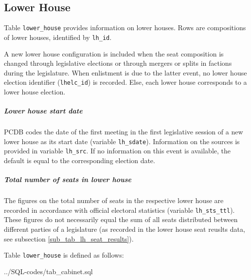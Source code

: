 \subsection{Lower House}\label{subsec_tab_lower_house}
Table \texttt{\footnotesize lower\_house} provides information on lower houses.
Rows are compositions of lower houses, identified by \texttt{\footnotesize lh\_id}. 

A new lower house configuration is included when the seat composition is changed through legislative elections or through mergers or splits in factions during the legislature. When enlistment is due to the latter event, no lower house 
election identifier (\texttt{\footnotesize lhelc\_id}) is recorded. Else, each lower house corresponds to a lower house election.

\subparagraph{Lower house start date}
PCDB codes the date of the first meeting in the first legislative session of a new lower house as its start date (variable \texttt{\footnotesize lh\_sdate}). Information on the sources is provided in variable \texttt{\footnotesize lh\_src}. If no information on this event is available, the default is equal to the corresponding election date. 

\subparagraph{Total number of seats in lower house} 
The figures on the total number of seats in the respective lower house are recorded in accordance with official electoral statistics (variable \texttt{\footnotesize lh\_sts\_ttl}). These figures do not necessarily equal the sum of all seats distributed between different parties of a legislature (as recorded in the lower house seat reuslts data,  see subsection \ref{sub_tab_lh_seat_results}).

Table \texttt{\footnotesize lower\_house} is defined as follows:

%
{../SQL-codes/tab_cabinet.sql}
